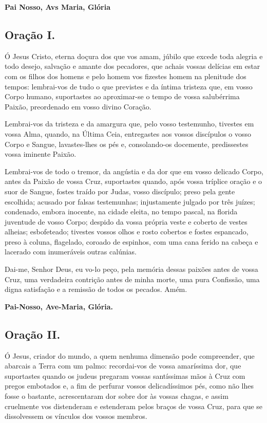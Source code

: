 \documentclass[11pt]{article}
\begin{document}
\textbf{Pai Nosso, Avs Maria, Glória}

\subsection{Oração I.}
Ó Jesus Cristo, eterna doçura dos que vos amam, júbilo que excede toda alegria e todo desejo, salvação e amante dos pecadores, que achais vossas delícias em estar com os filhos dos homens e pelo homem vos fizestes homem na plenitude dos tempos: lembrai-vos de tudo o que previstes e da íntima tristeza que, em vosso Corpo humano, suportastes ao aproximar-se o tempo de vossa salubérrima Paixão, preordenado em vosso divino Coração.

Lembrai-vos da tristeza e da amargura que, pelo vosso testemunho, tivestes em vossa Alma, quando, na Última Ceia, entregastes aos vossos discípulos o vosso Corpo e Sangue, lavastes-lhes os pés e, consolando-os docemente, predissestes vossa iminente Paixão. 

Lembrai-vos de todo o tremor, da angústia e da dor que em vosso delicado Corpo, antes da Paixão de vossa Cruz, suportastes quando, após vossa tríplice oração e o suor de Sangue, fostes traído por Judas, vosso discípulo; preso pela gente escolhida; acusado por falsas testemunhas; injustamente julgado por três juízes; condenado, embora inocente, na cidade eleita, no tempo pascal, na florida juventude de vosso Corpo; despido da vossa própria veste e coberto de vestes alheias; esbofeteado; tivestes vossos olhos e rosto cobertos e fostes espancado, preso à coluna, flagelado, coroado de espinhos, com uma cana ferido na cabeça e lacerado com inumeráveis outras calúnias.

Dai-me, Senhor Deus, eu vo-lo peço, pela memória dessas paixões antes de vossa Cruz, uma verdadeira contrição antes de minha morte, uma pura Confissão, uma digna satisfação e a remissão de todos os pecados. Amém. 

\textbf{Pai-Nosso, Ave-Maria, Glória.}

\subsection{Oração II.}
Ó Jesus, criador do mundo, a quem nenhuma dimensão pode compreender, que abarcais a Terra com um palmo: recordai-vos de vossa amaríssima dor, que suportastes quando os judeus pregaram vossas santíssimas mãos à Cruz com pregos embotados e, a fim de perfurar vossos delicadíssimos pés, como não lhes fosse o bastante, acrescentaram dor sobre dor às vossas chagas, e assim cruelmente vos distenderam e estenderam pelos braços de vossa Cruz, para que se dissolvessem os vínculos dos vossos membros.
\end{document}
